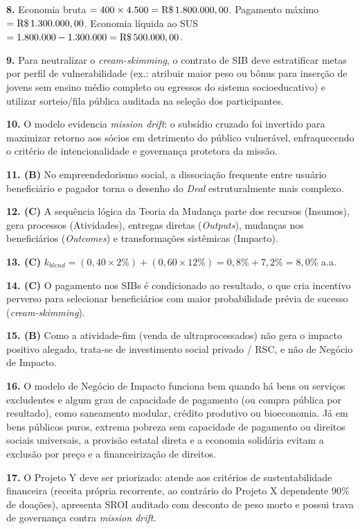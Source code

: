 \begin{boxGabarito}
\textbf{8.} Economia bruta $= 400 \times 4.500 = \text{R\$\,}{1.800.000,00}$. Pagamento máximo $= \text{R\$\,}{1.300.000,00}$. Economia líquida ao SUS $= 1.800.000 - 1.300.000 = \text{R\$\,}{500.000,00}$.

\textbf{9.} Para neutralizar o \textit{cream-skimming}, o contrato de SIB deve estratificar metas por perfil de vulnerabilidade (ex.: atribuir maior peso ou bônus para inserção de jovens sem ensino médio completo ou egressos do sistema socioeducativo) e utilizar sorteio/fila pública auditada na seleção dos participantes.

\textbf{10.} O modelo evidencia \textit{mission drift}: o subsídio cruzado foi invertido para maximizar retorno aos sócios em detrimento do público vulnerável, enfraquecendo o critério de intencionalidade e governança protetora da missão.

\textbf{11. (B)} No empreendedorismo social, a dissociação frequente entre usuário beneficiário e pagador torna o desenho do \textit{Deal} estruturalmente mais complexo.

\textbf{12. (C)} A sequência lógica da Teoria da Mudança parte dos recursos (Insumos), gera processos (Atividades), entregas diretas (\textit{Outputs}), mudanças nos beneficiários (\textit{Outcomes}) e transformações sistêmicas (Impacto).

\textbf{13. (C)} $k_{blend} = (0{,}40 \times 2\%) + (0{,}60 \times 12\%) = 0{,}8\% + 7{,}2\% = 8{,}0\%$ a.a.

\textbf{14. (C)} O pagamento nos SIBs é condicionado ao resultado, o que cria incentivo perverso para selecionar beneficiários com maior probabilidade prévia de sucesso (\textit{cream-skimming}).

\textbf{15. (B)} Como a atividade-fim (venda de ultraprocessados) não gera o impacto positivo alegado, trata-se de investimento social privado / RSC, e não de Negócio de Impacto.

\textbf{16.} O modelo de Negócio de Impacto funciona bem quando há bens ou serviços excludentes e algum grau de capacidade de pagamento (ou compra pública por resultado), como saneamento modular, crédito produtivo ou bioeconomia. Já em bens públicos puros, extrema pobreza sem capacidade de pagamento ou direitos sociais universais, a provisão estatal direta e a economia solidária evitam a exclusão por preço e a financeirização de direitos.

\textbf{17.} O Projeto Y deve ser priorizado: atende aos critérios de sustentabilidade financeira (receita própria recorrente, ao contrário do Projeto X dependente $90\%$ de doações), apresenta SROI auditado com desconto de peso morto e possui trava de governança contra \textit{mission drift}.


\end{boxGabarito}
